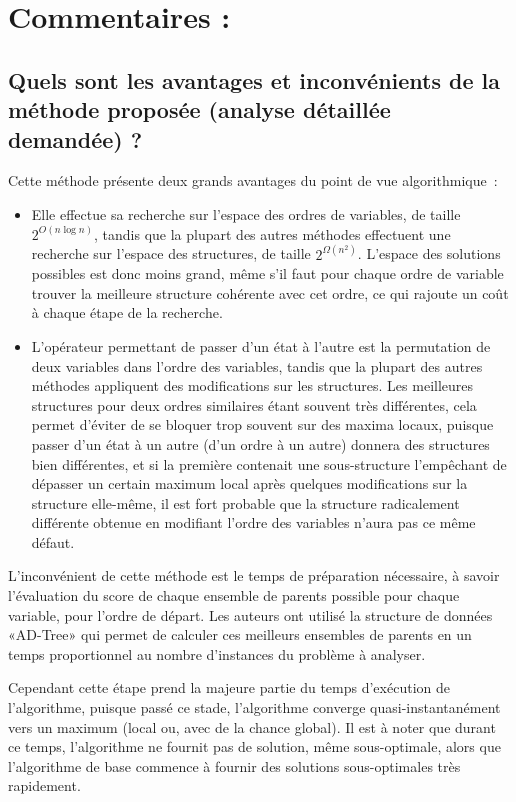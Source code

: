 \documentclass[french,a4paper]{article}
\begin{document}
\section{Commentaires :}
\subsection{Quels sont les avantages et inconvénients de la méthode proposée (analyse détaillée demandée) ?}

Cette méthode présente deux grands avantages du point de vue algorithmique~:
\begin{itemize}
\item Elle effectue sa recherche sur l'espace des ordres de variables,
  de taille $2^{O(n \log n)}$, tandis que la plupart des autres
  méthodes effectuent une recherche sur l'espace des structures, de
  taille $2^{\Omega(n^2)}$. L'espace des solutions possibles est donc
  moins grand, même s'il faut pour chaque ordre de variable trouver la
  meilleure structure cohérente avec cet ordre, ce qui rajoute un coût
  à chaque étape de la recherche.
\item L'opérateur permettant de passer d'un état à l'autre est la
  permutation de deux variables dans l'ordre des variables, tandis que
  la plupart des autres méthodes appliquent des modifications sur les
  structures. Les meilleures structures pour deux ordres similaires
  étant souvent très différentes, cela permet d'éviter de se bloquer
  trop souvent sur des maxima locaux, puisque passer d'un état à un
  autre (d'un ordre à un autre) donnera des structures bien
  différentes, et si la première contenait une sous-structure
  l'empêchant de dépasser un certain maximum local après quelques
  modifications sur la structure elle-même, il est fort probable que
  la structure radicalement différente obtenue en modifiant l'ordre
  des variables n'aura pas ce même défaut.
\end{itemize}

L'inconvénient de cette méthode est le temps de préparation
nécessaire, à savoir l'évaluation du score de chaque ensemble de
parents possible pour chaque variable, pour l'ordre de départ. Les
auteurs ont utilisé la structure de données «AD-Tree» qui permet de
calculer ces meilleurs ensembles de parents en un temps proportionnel
au nombre d'instances du problème à analyser.

Cependant cette étape prend la majeure partie du temps d'exécution de
l'algorithme, puisque passé ce stade, l'algorithme converge
quasi-instantanément vers un maximum (local ou, avec de la chance
global). Il est à noter que durant ce temps, l'algorithme ne fournit
pas de solution, même sous-optimale, alors que l'algorithme de base
commence à fournir des solutions sous-optimales très rapidement.
\end{document}
